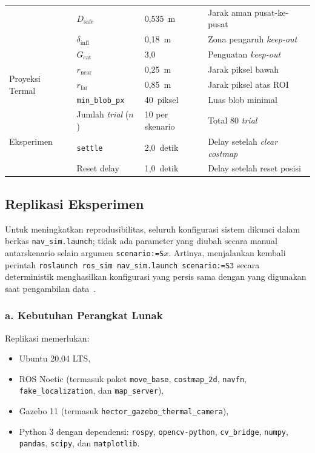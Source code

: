 \begin{table}[H]
\begin{tabular}{llll}
  & $D_\text{safe}$              & 0,535~m & Jarak aman pusat-ke-pusat \\
  & $\delta_\text{infl}$         & 0,18~m & Zona pengaruh \textit{keep-out} \\
  & $G_\text{cat}$               & 3,0    & Penguatan \textit{keep-out} \\
\midrule
\multirow{3}{*}{Proyeksi Termal}
  & $r_\text{near}$              & 0,25~m  & Jarak piksel bawah \\
  & $r_\text{far}$               & 0,85~m  & Jarak piksel atas ROI \\
  & \texttt{min\_blob\_px}       & 40~piksel & Luas blob minimal \\
\midrule
\multirow{3}{*}{Eksperimen}
  & Jumlah \textit{trial} ($n$)  & 10 per skenario & Total 80 \textit{trial} \\
  & \texttt{settle}              & 2,0~detik & Delay setelah \textit{clear costmap} \\
  & Reset delay                  & 1,0~detik & Delay setelah reset posisi \\
\bottomrule
\end{tabular}
\end{table}

\subsection{Replikasi Eksperimen}
\label{sec:replikasi}

Untuk meningkatkan reprodusibilitas, seluruh konfigurasi sistem dikunci dalam berkas \texttt{nav\_sim.launch}; tidak ada parameter yang diubah secara manual antarskenario selain argumen \texttt{scenario:=S$x$}. Artinya, menjalankan kembali perintah \texttt{roslaunch ros\_sim nav\_sim.launch scenario:=S3} secara deterministik menghasilkan konfigurasi yang persis sama dengan yang digunakan saat pengambilan data~\cite{Adiuku2024}.

\subsubsection*{a. Kebutuhan Perangkat Lunak}

Replikasi memerlukan:
\begin{itemize}
    \item Ubuntu 20.04 LTS,
    \item ROS Noetic (termasuk paket \texttt{move\_base}, \texttt{costmap\_2d}, \texttt{navfn}, \texttt{fake\_localization}, dan \texttt{map\_server}),
    \item Gazebo 11 (termasuk \texttt{hector\_gazebo\_thermal\_camera}),
    \item Python 3 dengan dependensi: \texttt{rospy}, \texttt{opencv-python}, \texttt{cv\_bridge}, \texttt{numpy}, \texttt{pandas}, \texttt{scipy}, dan \texttt{matplotlib}.
\end{itemize}

